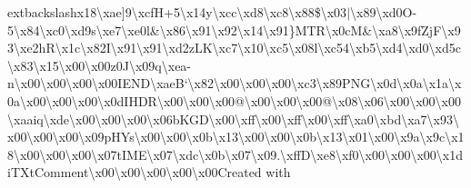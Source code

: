 \begin{DoxyCompactItemize}
extbackslash{}x18\textbackslash{}xae\mbox{]}9\textbackslash{}xcf\+H+5\textbackslash{}x14y\textbackslash{}xcc\textbackslash{}xd8\textbackslash{}xc8\textbackslash{}x88\$\textbackslash{}x03$\vert$\textbackslash{}x89\textbackslash{}xd0\+O-\/5\textbackslash{}x84\textbackslash{}xc0\textbackslash{}xd9s\textbackslash{}xe7\textbackslash{}xe0l\&\textbackslash{}x86\textbackslash{}x91\textbackslash{}x92\textbackslash{}x14\textbackslash{}x91\}\+M\+T\+R\textbackslash{}x0c\+M\&\textbackslash{}xa8\textbackslash{}x9f\+Zj\+F\textbackslash{}x93\textbackslash{}xe2h\+R\textbackslash{}x1c\textbackslash{}x82\+I\textbackslash{}x91\textbackslash{}x91\textbackslash{}xd2z\+L\+K\textbackslash{}xc7\textbackslash{}x10\textbackslash{}xc5\textbackslash{}x08l\textbackslash{}xc54\textbackslash{}xb5\textbackslash{}xd4\textbackslash{}xd0\textbackslash{}xd5c\textbackslash{}x83\textbackslash{}x15\textbackslash{}x00\textbackslash{}x00z0\+J\textbackslash{}x09q\textbackslash{}xea-\/n\textbackslash{}x00\textbackslash{}x00\textbackslash{}x00\textbackslash{}x00\+I\+E\+N\+D\textbackslash{}xae\+B`\textbackslash{}x82\textbackslash{}x00\textbackslash{}x00\textbackslash{}x00\textbackslash{}xc3\textbackslash{}x89\+P\+N\+G\textbackslash{}x0d\textbackslash{}x0a\textbackslash{}x1a\textbackslash{}x0a\textbackslash{}x00\textbackslash{}x00\textbackslash{}x00\textbackslash{}x0d\+I\+H\+D\+R\textbackslash{}x00\textbackslash{}x00\textbackslash{}x00@\textbackslash{}x00\textbackslash{}x00\textbackslash{}x00@\textbackslash{}x08\textbackslash{}x06\textbackslash{}x00\textbackslash{}x00\textbackslash{}x00\textbackslash{}xaaiq\textbackslash{}xde\textbackslash{}x00\textbackslash{}x00\textbackslash{}x00\textbackslash{}x06b\+K\+G\+D\textbackslash{}x00\textbackslash{}xff\textbackslash{}x00\textbackslash{}xff\textbackslash{}x00\textbackslash{}xff\textbackslash{}xa0\textbackslash{}xbd\textbackslash{}xa7\textbackslash{}x93\textbackslash{}x00\textbackslash{}x00\textbackslash{}x00\textbackslash{}x09p\+H\+Ys\textbackslash{}x00\textbackslash{}x00\textbackslash{}x0b\textbackslash{}x13\textbackslash{}x00\textbackslash{}x00\textbackslash{}x0b\textbackslash{}x13\textbackslash{}x01\textbackslash{}x00\textbackslash{}x9a\textbackslash{}x9c\textbackslash{}x18\textbackslash{}x00\textbackslash{}x00\textbackslash{}x00\textbackslash{}x07t\+I\+M\+E\textbackslash{}x07\textbackslash{}xdc\textbackslash{}x0b\textbackslash{}x07\textbackslash{}x09.\textbackslash{}xff\+D\textbackslash{}xe8\textbackslash{}xf0\textbackslash{}x00\textbackslash{}x00\textbackslash{}x00\textbackslash{}x1di\+T\+Xt\+Comment\textbackslash{}x00\textbackslash{}x00\textbackslash{}x00\textbackslash{}x00\textbackslash{}x00\+Created with 
\end{DoxyCompactItemize}
